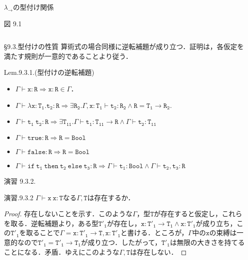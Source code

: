 \documentclass[9pt]{beamer}
\begin{document}
\begin{frame}{$\lambda_{\rightarrow}$の型付け関係}
\begin{dblock}{図 9.1}
\begin{columns}
\begin{column}{0.6\textwidth}
\begin{prooftree}
		\end{prooftree}
		\begin{prooftree}
		\end{prooftree}
		\begin{prooftree}
\end{prooftree}
\end{column}
\end{columns}
\end{dblock}
\end{frame}
\begin{frame}{\S9.3.型付けの性質}
算術式の場合同様に逆転補題が成り立つ．証明は，各仮定を満たす規則が一意的であることより従う．
\begin{alertblock}{Lem.9.3.1.(型付けの逆転補題)}
\begin{itemize}
\item $\Gamma\vdash\mathtt{x:R}\Longrightarrow \mathtt{x:R}\in\Gamma$．
\item $\Gamma\vdash\mathtt{\lambda x:T_{1}.t_{2}:R}\Longrightarrow\exists \mathtt{R_{2}}. \Gamma, \mathtt{x:T_{1}\vdash t_{2}:R_{2}\land R = T_{1}\rightarrow R_{2}}$.
\item $\Gamma\vdash\mathtt{t_{1}\ t_{2}:R}\Longrightarrow\exists \mathtt{T_{11}}.\Gamma\vdash \mathtt{t_{1}:T_{11}\rightarrow R}\land \Gamma\vdash\mathtt{t_{2}:\mathtt{T_{11}}}$
\item $\Gamma\vdash \mathtt{true:R}\Longrightarrow \mathtt{R = Bool}$
\item $\Gamma\vdash \mathtt{false:R}\Longrightarrow \mathtt{R = Bool}$
\item $\Gamma\vdash\mathtt{if\ t_{1}\ then\ t_{2}\ else\ t_{3}:R}\Longrightarrow\Gamma\vdash\mathtt{t_{1}:Bool}\land\Gamma\vdash\mathtt{t_{2},t_{3}:R}$
\end{itemize}
\end{alertblock}
\end{frame}
\begin{frame}{演習 9.3.2.}
\begin{alertblock}{演習.9.3.2}
$\Gamma \vdash\mathtt{x\ x:T}$なる$\Gamma, \mathtt{T}$は存在するか．
\end{alertblock}
\begin{proof}
存在しないことを示す．このような$\Gamma$，型$\mathtt{T}$が存在すると仮定し，これらを取る．逆転補題より，ある型$\mathtt{T'_{1}}$が存在し，$\mathtt{x:T'_{1}\rightarrow T_{1}}\land \mathtt{x:T'_{1}}$が成り立ち，この$\mathtt{T'_{1}}$を取ることで$\Gamma = \mathtt{x: T'_{1}\rightarrow T, x: T'_{1}}$と書ける．ところが，$\Gamma$中の$\mathtt{x}$の束縛は一意的なので$\mathtt{T'_{1} = T'_{1}\rightarrow T_{1}}$が成り立つ．したがって，$\mathtt{T'_{1}}$は無限の大きさを持てることになる．矛盾．ゆえにこのような$\Gamma,\mathtt{T}$は存在しない．
\end{proof}
\end{frame}
\end{document}
